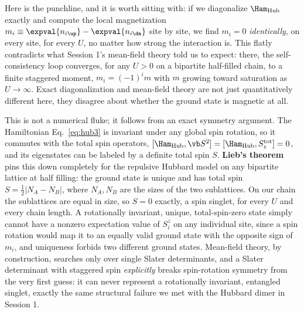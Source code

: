 \documentclass[all_sessions.tex]{subfiles}
\begin{document}
Here is the punchline, and it is worth sitting with: if we diagonalize $\Ham_{\mathrm{Hub}}$
exactly and compute the local magnetization $m_i \equiv \expval{n_{i\up}} - \expval{n_{i\dn}}$ site
by site, we find $m_i = 0$ \emph{identically}, on every site, for every $U$, no matter how strong
the interaction is. This flatly contradicts what Session 1's mean-field theory told us to expect:
there, the self-consistency loop converges, for any $U>0$ on a bipartite half-filled chain, to a
finite staggered moment, $m_i = (-1)^i m$ with $m$ growing toward saturation as $U\to\infty$. Exact
diagonalization and mean-field theory are not just quantitatively different here, they disagree
about whether the ground state is magnetic at all.

This is not a numerical fluke; it follows from an exact symmetry argument. The Hamiltonian
Eq.~\eqref{eq:hub3} is invariant under any global spin rotation, so it commutes with the total spin
operators, $[\Ham_{\mathrm{Hub}}, \vb S^2] = [\Ham_{\mathrm{Hub}}, S_z^{\mathrm{tot}}] = 0$, and its
eigenstates can be labeled by a definite total spin $S$. \textbf{Lieb's theorem}
pins this down completely for the repulsive Hubbard model on any bipartite lattice at half filling:
the ground state is unique and has total spin $S = \tfrac12|N_A - N_B|$, where $N_A, N_B$ are the
sizes of the two sublattices. On our chain the sublattices are equal in size, so $S=0$ exactly, a
spin singlet, for every $U$ and every chain length. A rotationally invariant, unique, total-spin-zero
state simply cannot have a nonzero expectation value of $S_i^z$ on any individual site, since a spin
rotation would map it to an equally valid ground state with the opposite sign of $m_i$, and
uniqueness forbids two different ground states. Mean-field theory, by construction, searches only
over single Slater determinants, and a Slater determinant with staggered spin \emph{explicitly}
breaks spin-rotation symmetry from the very first guess: it can never represent a rotationally
invariant, entangled singlet, exactly the same structural failure we met with the Hubbard dimer in
Session 1.
\end{document}
